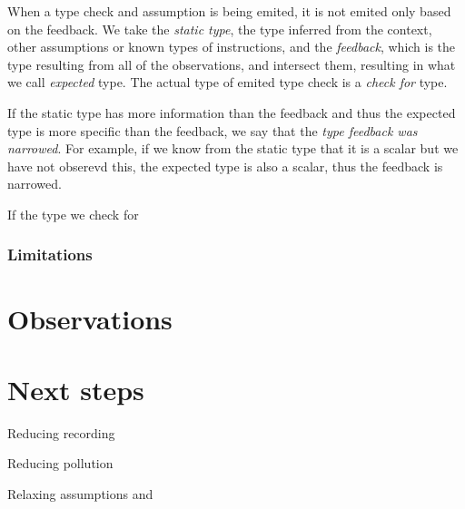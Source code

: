 When a type check and assumption is being emited, it is not emited only based on the feedback. We take the \textit{static type}, the type inferred from the context, other assumptions or known types of instructions, and the \textit{feedback}, which is the type resulting from all of the observations, and intersect them, resulting in what we call \textit{expected} type. The actual type of emited type check is a \textit{check for} type.

\begin{figure}
	\centering
\end{figure}

If the static type has more information than the feedback and thus the expected type is more specific than the feedback, we say that the \textit{type feedback was narrowed}. For example, if we know from the static type that it is a scalar but we have not obserevd this, the expected type is also a scalar, thus the feedback is narrowed.


If the type we check for

\subsubsection*{Limitations}

\section{Observations}

\section{Next steps}

Reducing recording

Reducing pollution

Relaxing assumptions and
